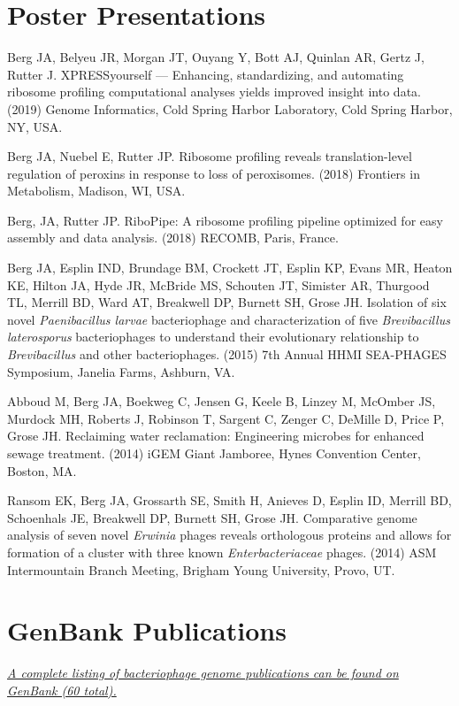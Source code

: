 \documentclass[margin,line]{res}
\begin{document}
\begin{resume}
\section{\sc Poster Presentations}
%
%

Berg JA, Belyeu JR, Morgan JT, Ouyang Y, Bott AJ, Quinlan AR, Gertz J, Rutter J. XPRESSyourself — Enhancing, standardizing, and automating ribosome profiling computational analyses yields improved insight into data. (2019) Genome Informatics, Cold Spring Harbor Laboratory, Cold Spring Harbor, NY, USA.

Berg JA, Nuebel E, Rutter JP. Ribosome profiling reveals translation-level regulation of peroxins in response to loss of peroxisomes. (2018) Frontiers in Metabolism, Madison, WI, USA.

Berg, JA, Rutter JP.  RiboPipe: A ribosome profiling pipeline optimized for easy assembly and data analysis. (2018) RECOMB, Paris, France.

Berg JA, Esplin IND, Brundage BM, Crockett JT, Esplin KP, Evans MR, Heaton KE, Hilton JA, Hyde JR, McBride MS, Schouten JT, Simister AR, Thurgood TL, Merrill BD, Ward AT, Breakwell DP, Burnett SH, Grose JH. Isolation of six novel \textit{Paenibacillus larvae} bacteriophage and characterization of five \textit{Brevibacillus laterosporus} bacteriophages to understand their evolutionary relationship to \textit{Brevibacillus} and other bacteriophages. (2015) 7th Annual HHMI SEA-PHAGES Symposium, Janelia Farms, Ashburn, VA.

Abboud M, Berg JA, Boekweg C, Jensen G, Keele B, Linzey M, McOmber JS, Murdock MH, Roberts J, Robinson T, Sargent C, Zenger C, DeMille D, Price P, Grose JH. Reclaiming water reclamation: Engineering microbes for enhanced sewage treatment. (2014) iGEM Giant Jamboree, Hynes Convention Center, Boston, MA.

Ransom EK, Berg JA, Grossarth SE, Smith H, Anieves D, Esplin ID, Merrill BD, Schoenhals JE, Breakwell DP, Burnett SH, Grose JH. Comparative genome analysis of seven novel \textit{Erwinia} phages reveals orthologous proteins and allows for formation of a cluster with three known \textit{Enterbacteriaceae} phages. (2014) ASM Intermountain Branch Meeting, Brigham Young University, Provo, UT.


\section{\sc GenBank Publications}
\href{https://bit.ly/2NWJ25Q}{\textit{A complete listing of bacteriophage genome publications can be found on GenBank (60 total).}}



\end{resume}
\end{document}
